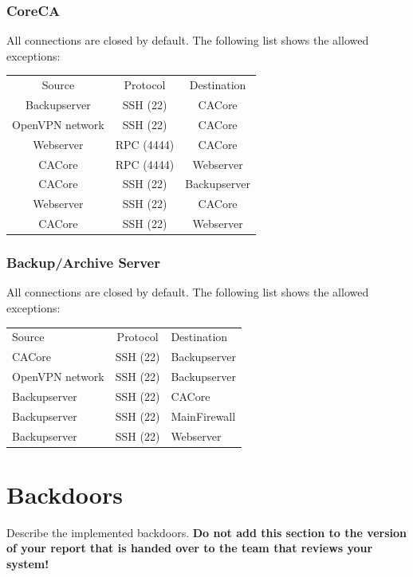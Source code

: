 \documentclass[a4paper, toc=index, 12pt, DIV14, twoside, BCOR2cm, headsepline, numbers=noenddot, bibliography=totoc]{report}
\begin{document}
\subsubsection{CoreCA}
All connections are closed by default. The following list shows the allowed exceptions:\newline


\begin{tabular}{c c c}
Source & Protocol & Destination \\
\cline{1-3}
Backupserver & SSH (22) & CACore \\
\cline{1-3}
OpenVPN network & SSH (22) & CACore \\
\cline{1-3}
Webserver & RPC (4444) & CACore \\
\cline{1-3}
CACore & RPC (4444) & Webserver \\
\cline{1-3}
CACore & SSH (22) & Backupserver \\
\cline{1-3}
Webserver & SSH (22) & CACore \\
\cline{1-3}
CACore & SSH (22) & Webserver \\
\end{tabular}

\subsubsection{Backup/Archive Server}
All connections are closed by default. The following list shows the allowed exceptions:\newline


\begin{tabular}{l c l}
Source & Protocol & Destination \\
\cline{1-3}
CACore & SSH (22) & Backupserver \\
\cline{1-3}
OpenVPN network & SSH (22) &  Backupserver\\
\cline{1-3}
Backupserver & SSH (22) & CACore \\
\cline{1-3}
Backupserver & SSH (22) & MainFirewall \\
\cline{1-3}
Backupserver & SSH (22) & Webserver \\
\end{tabular}

\section{Backdoors}
Describe the implemented backdoors. {\bfseries Do not add
    this section to the version of your report that is handed over to
    the team that reviews your system!}
\end{document}
